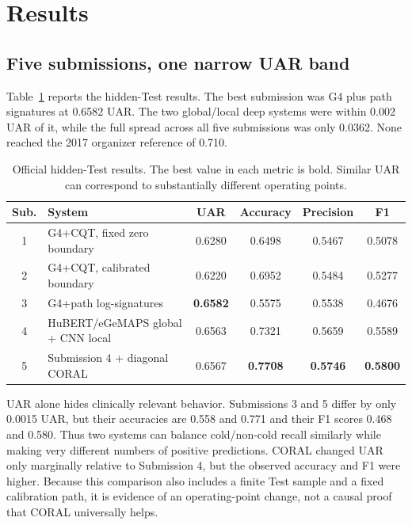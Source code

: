 \section{Results}
\label{sec:results}

\subsection{Five submissions, one narrow UAR band}

Table~\ref{tab:test} reports the hidden-Test results. The best submission was
G4 plus path signatures at 0.6582 UAR. The two global/local deep systems were
within 0.002 UAR of it, while the full spread across all five submissions was
only 0.0362. None reached the 2017 organizer reference of 0.710.

\begin{table}[t]
\centering
\caption{Official hidden-Test results. The best value in each metric is bold.
Similar UAR can correspond to substantially different operating points.}
\label{tab:test}
\small
\begin{tabular}{clcccc}
\toprule
Sub. & System & UAR & Accuracy & Precision & F1 \\
\midrule
1 & G4+CQT, fixed zero boundary              & 0.6280 & 0.6498 & 0.5467 & 0.5078 \\
2 & G4+CQT, calibrated boundary              & 0.6220 & 0.6952 & 0.5484 & 0.5277 \\
3 & G4+path log-signatures                   & \textbf{0.6582} & 0.5575 & 0.5538 & 0.4676 \\
4 & HuBERT/eGeMAPS global + CNN local        & 0.6563 & 0.7321 & 0.5659 & 0.5589 \\
5 & Submission 4 + diagonal CORAL            & 0.6567 & \textbf{0.7708} & \textbf{0.5746} & \textbf{0.5800} \\
\bottomrule
\end{tabular}
\end{table}

UAR alone hides clinically relevant behavior. Submissions 3 and 5 differ by
only 0.0015 UAR, but their accuracies are 0.558 and 0.771 and their F1 scores
0.468 and 0.580. Thus two systems can balance cold/non-cold recall similarly
while making very different numbers of positive predictions. CORAL changed
UAR only marginally relative to Submission 4, but the observed accuracy and F1
were higher. Because this comparison also includes a finite Test sample and a
fixed calibration path, it is evidence of an operating-point change, not a
causal proof that CORAL universally helps.

